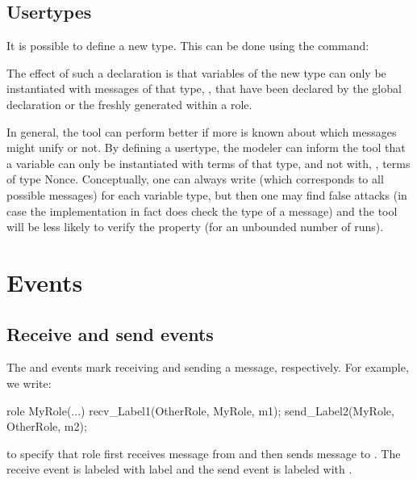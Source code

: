 \documentclass{book}
\begin{document}
\subsection{Usertypes}

It is possible to define a new type. This can be done
using the  command:
\begin{spdl}
usertype MyAtomicMessage;

protocol X(I,R) {
   role I {
      var y: MyAtomicMessage;

      recv_1(I,R, y );
\end{spdl}
The effect of such a declaration is that variables of the new type can
only be instantiated with messages  of that type, \ie, that have been
declared by the global declaration
or the freshly generated
 within a role.

In general, the tool can perform better if more is known about which messages might unify or not. By defining a usertype, the modeler can inform the tool that a variable can only be instantiated with terms of that type, and not with, \eg, terms of type Nonce.
Conceptually, one can always write  (which corresponds to all possible messages) for each variable type, but then one may find false attacks (in case the implementation in fact does check the type of a message) and the tool will be less likely to verify the property (for an unbounded number of runs).



\section{Events}

\subsection{Receive and send events}

The  and  events mark receiving and sending a
message, respectively. For example, we write:
\begin{spdl}
  role MyRole(...) {
    recv_Label1(OtherRole, MyRole, m1);
    send_Label2(MyRole, OtherRole, m2);
  }
\end{spdl}
to specify that role  first receives message  from
 and then sends message  to . The
receive event is labeled with label  and the send event is
labeled with .
\end{document}

